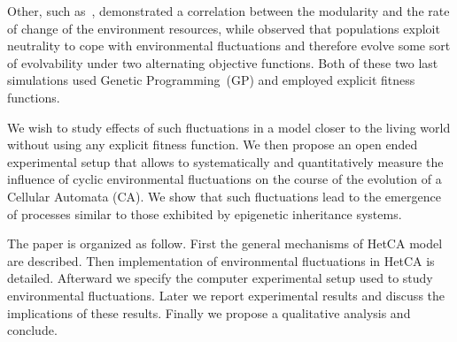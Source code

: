 Other, such as~\cite{lipson2002origin}, demonstrated a correlation between the modularity and the rate of change of the environment resources, while \cite{yu2007program} observed that populations exploit neutrality to cope with environmental fluctuations and therefore evolve some sort of evolvability under two alternating objective functions. Both of these two last simulations used Genetic Programming~(GP) and employed explicit fitness functions.

We wish to study effects of such fluctuations in a model closer to the living world without using any explicit fitness function. We then propose an open ended experimental setup that allows to systematically and quantitatively measure the influence of cyclic environmental fluctuations on the course of the evolution of a Cellular Automata (CA). We show that such fluctuations lead to the emergence of processes similar to those exhibited by epigenetic inheritance systems.

The paper is organized as follow. First the general mechanisms of HetCA model are described. Then implementation of environmental fluctuations in HetCA is detailed. Afterward we specify the computer experimental setup used to study environmental fluctuations. Later we report experimental results and discuss the implications of these results. Finally we propose a qualitative analysis and conclude.

